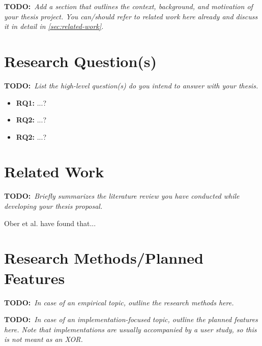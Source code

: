 \documentclass[pdftex,11pt,a4paper]{article}
\newcommand{\todo}[1]{{\textbf{TODO:}\ \textit{#1}}} %
\begin{document}
\todo{Add a section that outlines the context, background, and motivation of your thesis project. You can/should refer to related work here already and discuss it in detail in \autoref{sec:related-work}.}


\section{Research Question(s)}

\todo{List the high-level question(s) do you intend to answer with your thesis.}

\begin{itemize}[itemsep=-1ex]
	\item \textbf{RQ1:} ...?
	\item \textbf{RQ2:} ...?
	\item \textbf{RQ2:} ...?
\end{itemize}


\section{Related Work}
\label{sec:related-work}

\todo{Briefly summarizes the literature review you have conducted while developing your thesis proposal.}

Ober et al. have found that...~\cite{OberOthers2013}


\section{Research Methods/Planned Features}

\todo{In case of an empirical topic, outline the research methods here.}

\todo{In case of an implementation-focused topic, outline the planned features here. Note that implementations are usually accompanied by a user study, so this is not meant as an XOR.}
\end{document}
